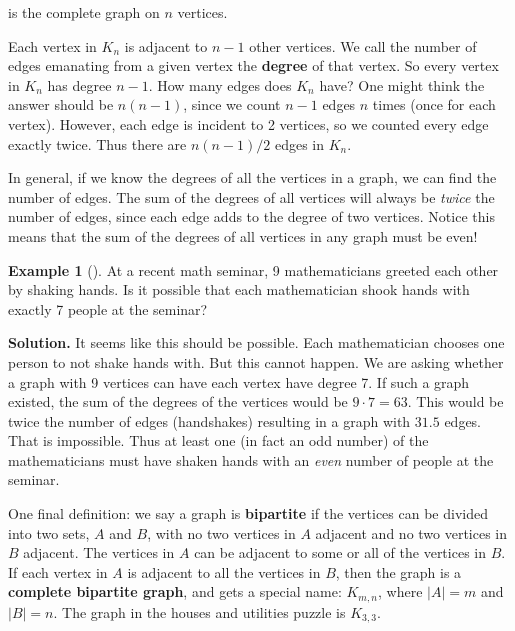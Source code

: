 \documentclass[10pt,]{book}
\newcommand{\terminology}[1]{\textbf{#1}}
\theoremstyle{plain}
\theoremstyle{definition}
\theoremstyle{definition}
\newtheorem{example}[theorem]{Example}
\theoremstyle{definition}
\numberwithin{equation}{chapter}
\begin{document}
 is the complete graph on \(n\) vertices.%
\par
\hypertarget{p-1329}{}%
Each vertex in \(K_n\) is adjacent to \(n-1\) other vertices. We call the number of edges emanating from a given vertex the \terminology{degree} of that vertex. So every vertex in \(K_n\) has degree \(n-1\). How many edges does \(K_n\) have? One might think the answer should be \(n(n-1)\), since we count \(n-1\) edges \(n\) times (once for each vertex). However, each edge is incident to 2 vertices, so we counted every edge exactly twice. Thus there are \(n(n-1)/2\) edges in \(K_n\). %
\par
\hypertarget{p-1330}{}%
In general, if we know the degrees of all the vertices in a graph, we can find the number of edges. The sum of the degrees of all vertices will always be \emph{twice} the number of edges, since each edge adds to the degree of two vertices. Notice this means that the sum of the degrees of all vertices in any graph must be even!%
\begin{example}[]\label{example-5}
\hypertarget{p-1331}{}%
At a recent math seminar, 9 mathematicians greeted each other by shaking hands. Is it possible that each mathematician shook hands with exactly 7 people at the seminar?%
\par\smallskip%
\noindent\textbf{Solution.}\hypertarget{solution-232}{}\quad%
\hypertarget{p-1332}{}%
It seems like this should be possible. Each mathematician chooses one person to not shake hands with. But this cannot happen. We are asking whether a graph with 9 vertices can have each vertex have degree 7. If such a graph existed, the sum of the degrees of the vertices would be \(9\cdot 7 = 63\). This would be twice the number of edges (handshakes) resulting in a graph with \(31.5\) edges. That is impossible. Thus at least one (in fact an odd number) of the mathematicians must have shaken hands with an \emph{even} number of people at the seminar.%
\end{example}
\hypertarget{p-1333}{}%
One final definition: we say a graph is \terminology{bipartite} if the vertices can be divided into two sets, \(A\) and \(B\), with no two vertices in \(A\) adjacent and no two vertices in \(B\) adjacent. The vertices in \(A\) can be adjacent to some or all of the vertices in \(B\). If each vertex in \(A\) is adjacent to all the vertices in \(B\), then the graph is a \terminology{complete bipartite graph}, and gets a special name: \(K_{m,n}\), where \(|A| = m\) and \(|B| = n\). The graph in the houses and utilities puzzle is \(K_{3,3}\).%
\typeout{************************************************}
\typeout{************************************************}
\end{document}
